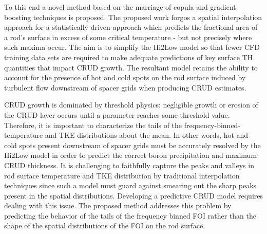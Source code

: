To this end a novel method based on the marriage of copula and gradient
boosting techniques is proposed.  The proposed work forgos a spatial
interpolation approach for a statistically driven approach which predicts the
fractional area of a rod's surface in excess of some critical temperature - but
not precisely where such maxima occur.  The aim is to simplify the Hi2Low model
so that fewer CFD training data sets are required to make adequate predictions
of key surface TH quantities that impact CRUD growth.  The resultant model
retains the ability to account for the presence of hot and cold spots on the rod surface induced by
turbulent flow downstream of spacer grids when producing CRUD estimates.

CRUD growth is dominated by threshold physics: negligible growth or erosion of
the CRUD layer occurs until a parameter reaches some threshold value.
Therefore, it is important to characterize the tails of the
frequency-binned-temperature and TKE distributions about the mean.  In other
words, hot and cold spots present downstream of spacer grids must be accurately
resolved by the Hi2Low model in order to predict the correct boron
precipitation and maximum CRUD thickness.  It is challenging to faithfully
capture the peaks and valleys in rod surface temperature and TKE distribution
by traditional interpolation techniques since such a model must guard against
smearing out the sharp peaks present in the spatial distributions.  Developing
a predictive CRUD model requires dealing with this issue. The proposed method
addresses this problem by predicting the behavior of the tails of the frequency
binned FOI rather than the shape of the spatial distributions of the FOI on
the rod surface.
